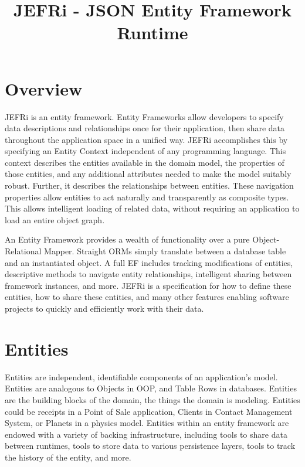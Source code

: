 \documentclass{article}
\begin{document}
\title{JEFRi - JSON Entity Framework Runtime}
\maketitle
\tableofcontents
\newpage
\linespread{1.6}

\section{Overview}

JEFRi is an entity framework. Entity Frameworks allow developers to specify data
descriptions and relationships once for their application, then share data
throughout the application space in a unified way. JEFRi accomplishes this by
specifying an Entity Context independent of any programming language. This
context describes the entities available in the domain model, the properties of
those entities, and any additional attributes needed to make the model suitably
robust. Further, it describes the relationships between entities. These
navigation properties allow entities to act naturally and transparently as
composite types. This allows intelligent loading of related data, without
requiring an application to load an entire object graph.

An Entity Framework provides a wealth of functionality over a pure Object-
Relational Mapper. Straight ORMs simply translate between a database table and
an instantiated object. A full EF includes tracking modifications of entities,
descriptive methods to navigate entity relationships, intelligent sharing
between framework instances, and more. JEFRi is a specification for how to
define these entities, how to share these entities, and many other features
enabling software projects to quickly and efficiently work with their data.


\section{Entities}

Entities are independent, identifiable components of an application's model.
Entities are analogous to Objects in OOP, and Table Rows in databases. Entities
are the building blocks of the domain, the things the domain is modeling.
Entities could be receipts in a Point of Sale application, Clients in Contact
Management System, or Planets in a physics model. Entities within an entity
framework are endowed with a variety of backing infrastructure, including tools
to share data between runtimes, tools to store data to various persistence
layers, tools to track the history of the entity, and more.
\end{document}
